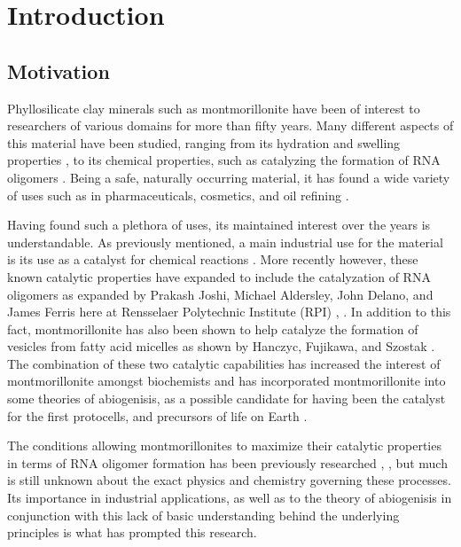 \chapter{Introduction}
\section{Motivation}
Phyllosilicate clay minerals such as montmorillonite have been of interest to researchers of various domains for more than fifty years. Many different aspects of this material have been studied, ranging from its hydration and swelling properties \cite{aldrich1944hydration}, to its chemical properties, such as catalyzing the formation of RNA oligomers \cite{joshi2009mechanism}. Being a safe, naturally occurring material, it has found a wide variety of uses such as in pharmaceuticals, cosmetics, and oil refining \cite{hartwell1965diverse}.

Having found such a plethora of uses, its maintained interest over the years is understandable. As previously mentioned, a main industrial use for the material is its use as a catalyst for chemical reactions \cite{hartwell1965diverse}. More recently however, these known catalytic properties have expanded to include the catalyzation of RNA oligomers as expanded by Prakash Joshi, Michael Aldersley, John Delano, and James Ferris here at Rensselaer Polytechnic Institute (RPI) \cite{joshi2009mechanism}, \cite{aldersley2011role}. In addition to this fact, montmorillonite has also been shown to help catalyze the formation of vesicles from fatty acid micelles as shown by Hanczyc, Fujikawa, and Szostak \cite{hanczyc2003experimental}. The combination of these two catalytic capabilities has increased the interest of montmorillonite amongst biochemists and has incorporated montmorillonite into some theories of abiogenisis, as a possible candidate for having been the catalyst for the first protocells, and precursors of life on Earth \cite{hanczyc2003experimental}.

The conditions allowing montmorillonites to maximize their catalytic properties in terms of RNA oligomer formation has been previously researched \cite{aldersley2011role}, \cite{aldersley2011evaluation}, but much is still unknown about the exact physics and chemistry governing these processes. Its importance in industrial applications, as well as to the theory of abiogenisis in conjunction with this lack of basic understanding behind the underlying principles is what has prompted this research.

